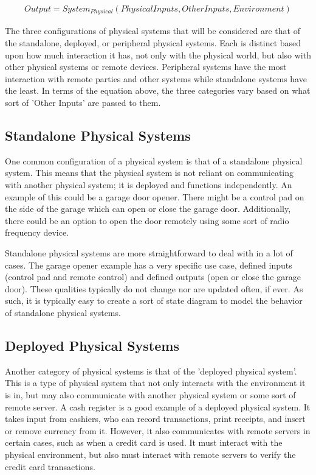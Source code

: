 \vspace*{-20pt}
\begin{align*}
Output = System_{Physical}(Physical Inputs, Other Inputs, Environment)
\end{align*}

The three configurations of physical systems that will be considered are that of the standalone, deployed, or peripheral physical
systems. Each is distinct based upon how much interaction it has, not only with the physical world, but also with other physical
systems or remote devices. Peripheral systems have the most interaction with remote parties and other systems while standalone
systems have the least. In terms of the equation above, the three categories vary based on what sort of 'Other Inputs' are passed
to them.

\subsection{Standalone Physical Systems}
One common configuration of a physical system is that of a standalone physical system. This means that the
physical system is not reliant on communicating with another physical system; it is deployed and functions
independently. An example of this could be a garage door opener. There might be a control pad on the side of the
garage which can open or close the garage door. Additionally, there could be an option to open the door remotely
using some sort of radio frequency device.

Standalone physical systems are more straightforward to deal with in a lot of cases. The garage opener example has
a very specific use case, defined inputs (control pad and remote control) and defined outputs (open or close the garage
door). These qualities typically do not change nor are updated often, if ever. As such, it is typically easy to create a sort
of state diagram to model the behavior of standalone physical systems.

\subsection{Deployed Physical Systems}
Another category of physical systems is that of the 'deployed physical system'. This is a type of physical system that not only
interacts with the environment it is in, but may also communicate with another physical system or some sort of remote
server. A cash register is a good example of a deployed physical system. It takes input from cashiers, who can record transactions,
print receipts, and insert or remove currency from it. However, it also communicates with remote servers in certain cases, such
as when a credit card is used. It must interact with the physical environment, but also must interact with remote servers to verify
the credit card transactions.

